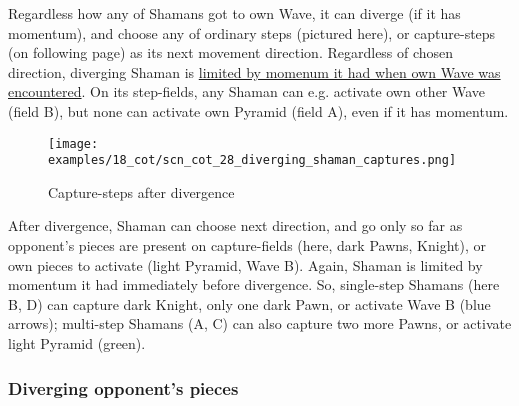 \vspace*{-0.4\baselineskip}
Regardless how any of Shamans got to own Wave, it can diverge (if it has momentum),
and choose any of ordinary steps (pictured here), or capture-steps (on following page)
as its next movement direction. Regardless of chosen direction, diverging Shaman is
\hyperref[fig:scn_cot_10_own_shaman_is_divergent_end]{limited by momenum it had when own Wave was encountered}. \newline
\indent
On its step-fields, any Shaman can e.g. activate own other Wave (field B), but none
can activate own Pyramid (field A), even if it has momentum.

\clearpage %

\vspace*{-2.1\baselineskip}
\noindent
\begin{figure}[!h]
\texttt{[image: examples/18\_cot/scn\_cot\_28\_diverging\_shaman\_captures.png]}
\vspace*{-1.3\baselineskip}
\caption{Capture-steps after divergence}
\label{fig:scn_cot_28_diverging_shaman_captures}
\end{figure}

\vspace*{-0.4\baselineskip}
After divergence, Shaman can choose next direction, and go only so far as opponent's
pieces are present on capture-fields (here, dark Pawns, Knight), or own pieces to
activate (light Pyramid, Wave B).  \newline
\indent
Again, Shaman is limited by momentum it had immediately before divergence. So,
single-step Shamans (here B, D) can capture dark Knight, only one dark Pawn, or
activate Wave B (blue arrows); multi-step Shamans (A, C) can also capture two
more Pawns, or activate light Pyramid (green).

\clearpage %

\subsubsection*{Diverging opponent's pieces}
\label{sec:Conquest of Tlalocan/Shaman/Divergence/Diverging opponent's pieces}

\TODO

